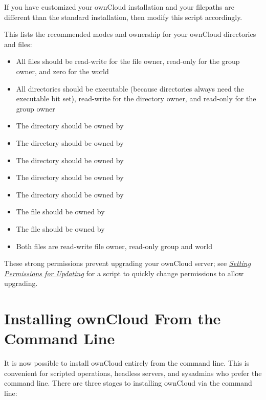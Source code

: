 \documentclass[letterpaper,10pt,english]{sphinxmanual}
\begin{document}
If you have customized your ownCloud installation and your filepaths are
different than the standard installation, then modify this script accordingly.

This lists the recommended modes and ownership for your ownCloud directories
and files:
\begin{itemize}
\item {} 
All files should be read-write for the file owner, read-only for the
group owner, and zero for the world

\item {} 
All directories should be executable (because directories always need the
executable bit set), read-write for the directory owner, and read-only for
the group owner

\item {} 
The  directory should be owned by 

\item {} 
The  directory should be owned by 

\item {} 
The  directory should be owned by 

\item {} 
The  directory should be owned by 

\item {} 
The  directory should be owned by 

\item {} 
The  file should be owned by 

\item {} 
The  file should be owned by 

\item {} 
Both  files are read-write file owner, read-only group and
world

\end{itemize}

These strong permissions prevent upgrading your ownCloud server;
see {\hyperref[maintenance/update:set-updating-permissions-label]{\emph{Setting Permissions for Updating}}} for a script to quickly change
permissions to allow upgrading.


\section{Installing ownCloud From the Command Line}
\label{installation/command_line_installation:installing-owncloud-from-the-command-line}\label{installation/command_line_installation::doc}
It is now possible to install ownCloud entirely from the command line. This is
convenient for scripted operations, headless servers, and sysadmins who prefer
the command line. There are three stages to installing ownCloud via the command
line:
\end{document}
